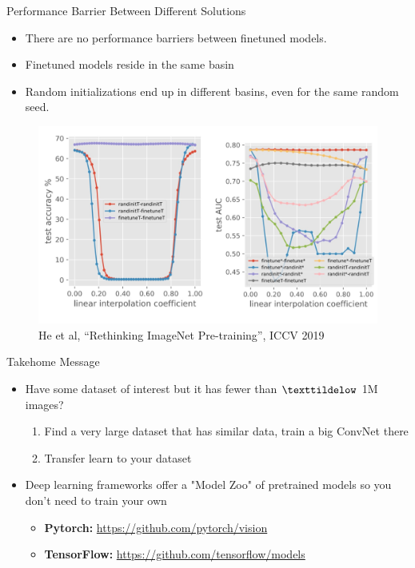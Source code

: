 \documentclass[serif, aspectratio=169]{beamer}
\begin{document}
\begin{frame}{Performance Barrier Between Different Solutions}
	\begin{itemize}
		\item There are no performance barriers between finetuned models.
		\item Finetuned models reside in the same basin
		\item Random initializations end up in different basins, even for the same random seed.
	\end{itemize}
	
	\begin{figure}
		\includegraphics[keepaspectratio, scale=0.22]{pic/what_TL2}
		\vspace{-1.4em}
		\caption*{\scriptsize He et al, “Rethinking ImageNet Pre-training”, ICCV 2019}
	\end{figure}
\end{frame}

\begin{frame}{Takehome Message}
	\begin{itemize}
		\item Have some dataset of interest but it has fewer than $\texttildelow$ 1M images?
		\begin{enumerate}
			\item Find a very large dataset that has similar data, train a big ConvNet there
			\item Transfer learn to your dataset
		\end{enumerate}
		\item Deep learning frameworks offer a "Model Zoo" of pretrained models so you don't need to train your own
		\begin{itemize}
			\item \textbf{Pytorch:} \href{https://github.com/pytorch/vision}{\color{blue} https://github.com/pytorch/vision}
			\item \textbf{TensorFlow:} \href{https://github.com/tensorflow/models}{\color{blue} https://github.com/tensorflow/models}
		\end{itemize}

	\end{itemize}
\end{frame}
\end{document}
